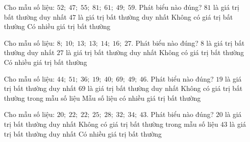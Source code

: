 \begin{ex}
	Cho mẫu số liệu: $52;\; 47;\; 55;\; 81;\; 61;\; 49;\; 59$. Phát biểu nào đúng?
	\choice
	{\True $81$ là giá trị bất thường duy nhất}
	{$47$ là giá trị bất thường duy nhất}
	{Không có giá trị bất thường}
	{Có nhiều giá trị bất thường}
\end{ex}

\begin{ex}
	Cho mẫu số liệu: $8;\; 10;\; 13;\; 13;\; 14;\; 16;\; 27$. Phát biểu nào đúng?
	\choice
	{$8$ là giá trị bất thường duy nhất}
	{\True $27$ là giá trị bất thường duy nhất}
	{Không có giá trị bất thường}
	{Có nhiều giá trị bất thường}
\end{ex}

\begin{ex}
	Cho mẫu số liệu: $44;\; 51;\; 36;\; 19;\; 40;\; 69;\; 49;\; 46$. Phát biểu nào đúng?
	\choice
	{$19$ là giá trị bất thường duy nhất}
	{$69$ là giá trị bất thường duy nhất}
	{\True Không có giá trị bất thường trong mẫu số liệu}
	{Mẫu số liệu có nhiều giá trị bất thường}
\end{ex}

\begin{ex}
	Cho mẫu số liệu: $20;\; 22;\; 22;\; 25;\; 28;\; 32;\; 34;\; 43$. Phát biểu nào đúng?
	\choice
	{$20$ là giá trị bất thường duy nhất}
	{\True Không có giá trị bất thường trong mẫu số liệu}
	{$43$ là giá trị bất thường duy nhất}
	{Có nhiều giá trị bất thường}
\end{ex}

